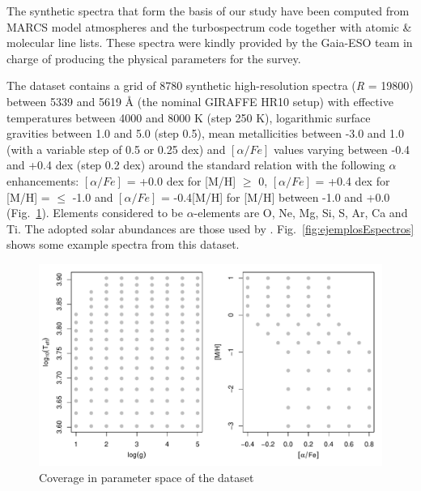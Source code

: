\documentclass[a4paper,fleqn,usenatbib]{mnras}
\begin{document}
{{{The synthetic spectra that form the basis of our study have been
computed from MARCS model atmospheres \citep{gustafsson:08} and the
turbospectrum code \citep{alvarez:98, plez:12} together with atomic \&
molecular line lists. These spectra were kindly provided by the
Gaia-ESO team in charge of producing the physical parameters for the
survey.

The dataset contains a grid of 8780 synthetic high-resolution spectra
(\textit{R} = 19800) between 5339 and 5619 {\AA} (the nominal GIRAFFE
HR10 setup) with effective temperatures between 4000 and 8000 K (step
250 K), logarithmic surface gravities between 1.0 and 5.0 (step 0.5),
mean metallicities between -3.0 and 1.0 (with a variable step of 0.5
or 0.25 dex) and $\left[ \alpha/Fe \right]$ values varying between
-0.4 and +0.4 dex (step 0.2 dex) around the standard relation with the
following $\alpha$ enhancements: $\left[ \alpha/Fe \right]$ = +0.0 dex
for [M/H] $\geqslant$ 0, $\left[ \alpha/Fe \right]$ = +0.4 dex for
[M/H] = $\leqslant$ -1.0 and $\left[ \alpha/Fe \right]$ = -0.4[M/H]
for [M/H] between -1.0 and +0.0 (Fig.~\ref{fig:gridModelos}).
Elements considered to be $\alpha$-elements are O, Ne, Mg, Si, S, Ar,
Ca and Ti. The adopted solar abundances are those used by
\citep{gustafsson:08}.  Fig.~\ref{fig:ejemplosEspectros} shows some
example spectra from this dataset.

\begin{figure}
\centering\includegraphics[width=\columnwidth]{grid_modelos.pdf}
\caption{Coverage in parameter space of the dataset}
\label{fig:gridModelos}
\end{figure}

}}}
\end{document}
